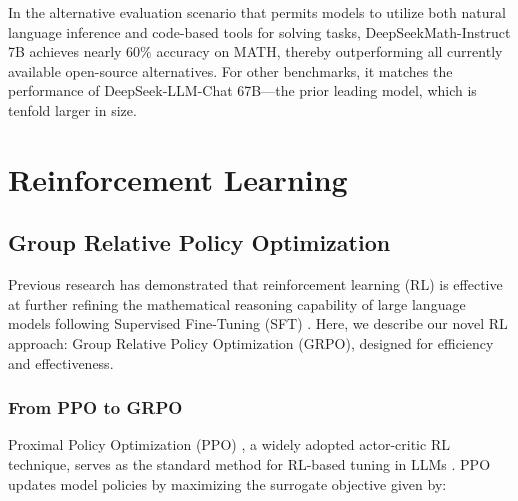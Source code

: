 In the alternative evaluation scenario that permits models to utilize both natural language inference and code-based tools for solving tasks, DeepSeekMath-Instruct 7B achieves nearly 60\% accuracy on MATH, thereby outperforming all currently available open-source alternatives. For other benchmarks, it matches the performance of DeepSeek-LLM-Chat 67B—the prior leading model, which is tenfold larger in size.

\section{Reinforcement Learning}

\subsection{Group Relative Policy Optimization} Previous research has demonstrated that reinforcement learning (RL) is effective at further refining the mathematical reasoning capability of large language models following Supervised Fine-Tuning (SFT) \citep{wang2023math,wizardmath}. Here, we describe our novel RL approach: Group Relative Policy Optimization (GRPO), designed for efficiency and effectiveness.

\subsubsection{From PPO to GRPO} Proximal Policy Optimization (PPO) \citep{schulman2017proximal}, a widely adopted actor-critic RL technique, serves as the standard method for RL-based tuning in LLMs \citep{ouyang2022training}. PPO updates model policies by maximizing the surrogate objective given by:


